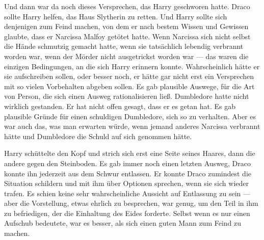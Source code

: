 Und dann war da noch dieses Versprechen, das Harry geschworen hatte.
Draco sollte Harry helfen, das Haus Slytherin zu retten. Und Harry sollte sich denjenigen zum Feind machen, von dem er nach bestem Wissen und Gewissen glaubte, dass er Narcissa Malfoy getötet hatte. Wenn Narcissa sich nicht selbst die Hände schmutzig gemacht hatte, wenn sie tatsächlich lebendig verbrannt worden war, wenn der Mörder nicht ausgetrickst worden war — das waren die einzigen Bedingungen, an die sich Harry erinnern konnte. Wahrscheinlich hätte er sie aufschreiben sollen, oder besser noch, er hätte gar nicht erst ein Versprechen mit so vielen Vorbehalten abgeben sollen.
Es gab plausible Auswege, für die Art von Person, die sich einen Ausweg rationalisieren ließ. Dumbledore hatte nicht wirklich gestanden. Er hat nicht offen gesagt, dass er es getan hat. Es gab plausible Gründe für einen schuldigen Dumbledore, sich so zu verhalten. Aber es war auch das, was man erwarten würde, wenn jemand anderes Narcissa verbrannt hätte und Dumbledore die Schuld auf sich genommen hätte.

Harry schüttelte den Kopf und strich sich erst eine Seite seines Haares, dann die andere gegen den Steinboden. Es gab immer noch einen letzten Ausweg, Draco konnte ihn jederzeit aus dem Schwur entlassen. Er konnte Draco zumindest die Situation schildern und mit ihm über Optionen sprechen, wenn sie sich wieder trafen. Es schien keine sehr wahrscheinliche Aussicht auf Entlassung zu sein — aber die Vorstellung, etwas ehrlich zu besprechen, war genug, um den Teil in ihm zu befriedigen, der die Einhaltung des Eides forderte. Selbst wenn es nur einen Aufschub bedeutete, war es besser, als sich einen guten Mann zum Feind zu machen.

